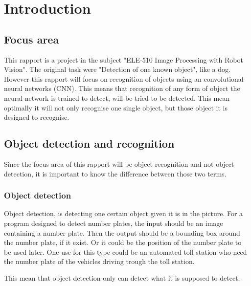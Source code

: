 \newpage
{}
\setcounter{page}{4}
\section{Introduction}

\subsection{Focus area}
This rapport is a project in the subject "ELE-510 Image Processing with Robot Vision". The original task were "Detection of one known object", like a dog. However this rapport will focus on recognition of objects using an convolutional neural networks (CNN). This means that recognition of any form of object the neural network is trained to detect, will be tried to be detected. This mean optimally it will not only recognise one single object, but those object it is designed to recognise. 

\subsection{Object detection and recognition}
Since the focus area of this rapport will be object recognition and not object detection, it is important to know the difference between those two terms. 

\subsubsection*{Object detection}
Object detection, is detecting one certain object given it is in the picture. For a program designed to detect number plates, the input should be an image containing a number plate. Then the output should be a bounding box around the number plate, if it exist. Or it could be the position of the number plate to be used later. One use for this type could be an automated toll station who need the number plate of the vehicles driving trough the toll station.

This mean that object detection only can detect what it is supposed to detect.

